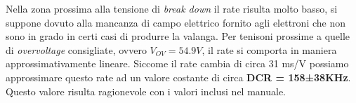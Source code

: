 Nella zona prossima alla tensione di \textit{break down} il rate risulta molto basso, si suppone dovuto alla mancanza di campo elettrico fornito agli elettroni che non sono in grado in certi casi di produrre la valanga. Per tenisoni prossime a quelle di \textit{overvoltage} consigliate, ovvero $V_{OV} = 54.9V$, il rate si comporta in maniera approssimativamente lineare. Siccome il rate cambia di circa 31 ms/V possiamo approssimare questo rate ad un valore costante di circa \textbf{DCR = 158±38KHz}.
Questo valore risulta ragionevole con i valori inclusi nel manuale.